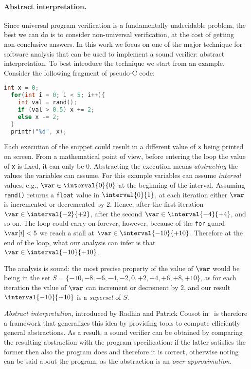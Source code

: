 \paragraph*{Abstract interpretation.} Since universal program
verification is a fundamentally undecidable problem, the best we can
do is to consider non-universal verification, at the cost of getting
non-conclusive answers. In this work we focus on one of the major
technique for software analysis that can be used to implement a sound
verifier: abstract interpretation. To best introduce the technique we
start from an example. Consider the following fragment of pseudo-C
code:

\begin{lstlisting}[language=C, label=codeexample, caption=Incrementing or decrementing randomly]
  int x = 0;
  for(int i = 0; i < 5; i++){
    int val = rand();
    if (val > 0.5) x += 2;
    else x -= 2;
  }
  printf("%d", x);
\end{lstlisting}

Each execution of the snippet could result in a different value of
\texttt{x} being printed on screen. From a mathematical point of view,
before entering the loop the value of \texttt{x} is fixed, it can only
be \(0\). Abstracting the execution means \emph{abstracting} the
values the variables can assume. For this example variables can assume
\emph{interval} values, e.g., \(\var \in \interval{0}{0}\) at the
beginning of the interval. Assuming \texttt{rand()} returns a
\texttt{float} value in \(\interval{0}{1}\), at each iteration either
\(\var\) is incremented or decremented by 2. Hence, after the first
iteration \(\var \in \interval{-2}{+2}\), after the second
\(\var \in \interval{-4}{+4}\), and so on. The loop could carry on
forever, however, because of the \texttt{for} guard \(\var[i] < 5\) we
reach a stall at \(\var \in \interval{-10}{+10}\). Therefore at the end
of the loop, what our analysis can infer is that
\(\var \in \interval{-10}{+10}\).

\medskip

\noindent
The analysis is sound: the most precise property of the value of
\(\var\) would be being in the set
\({S = \{-10, -8, -6, -4, -2, 0, +2, +4, +6, +8, +10\}}\), as for each
iteration the value of \(\var\) can increment or decrement by \(2\),
and our result \(\interval{-10}{+10}\) is a \emph{superset} of \(S\).

\medskip

\emph{Abstract interpretation}, introduced by Radhia and Patrick
Cousot in~\cite{patrickradhia:one, patrickradhia:two} is therefore a
framework that generalizes this idea by providing tools to compute
efficiently general abstractions. As a result, a sound verifier can be
obtained by comparing the resulting abstraction with the program
specification: if the latter satisfies the former then also the
program does and therefore it is correct, otherwise noting can be said
about the program, as the abstraction is an \emph{over-approximation}.

